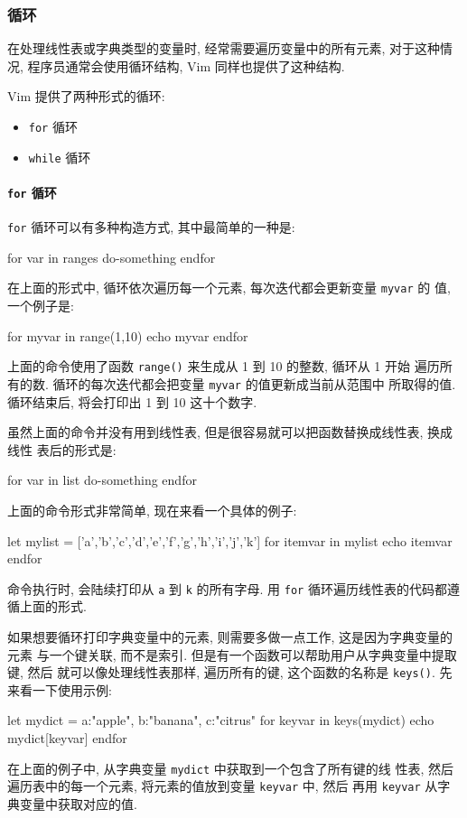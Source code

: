 \subsubsection{循环}
\label{subsubsec:loops}

在处理线性表或字典类型的变量时, 经常需要遍历变量中的所有元素, 对于这种情况,
程序员通常会使用循环结构, Vim 同样也提供了这种结构.

Vim 提供了两种形式的循环:
\begin{itemize}
	\item \texttt{for} 循环
	\item \texttt{while} 循环
\end{itemize}

\paragraph{\texttt{for} 循环}
\label{para:for_loops}

\texttt{for} 循环可以有多种构造方式, 其中最简单的一种是:
\begin{vimcode}
for var in ranges
	do-something
endfor
\end{vimcode}
在上面的形式中, 循环依次遍历每一个元素, 每次迭代都会更新变量 \texttt{myvar} 的
值, 一个例子是:
\begin{vimcode}
for myvar in range(1,10)
	echo myvar
endfor
\end{vimcode}
上面的命令使用了函数 \texttt{range()} 来生成从 1 到 10 的整数, 循环从 1 开始
遍历所有的数. 循环的每次迭代都会把变量 \texttt{myvar} 的值更新成当前从范围中
所取得的值. 循环结束后, 将会打印出 1 到 10 这十个数字.

虽然上面的命令并没有用到线性表, 但是很容易就可以把函数替换成线性表, 换成线性
表后的形式是:
\begin{vimcode}
for var in list
	do-something
endfor
\end{vimcode}
上面的命令形式非常简单, 现在来看一个具体的例子:
\begin{vimcode}
let mylist = ['a','b','c','d','e','f','g','h','i','j','k']
for itemvar in mylist
    echo itemvar
endfor
\end{vimcode}
命令执行时, 会陆续打印从 \texttt{a} 到 \texttt{k} 的所有字母. 用 \texttt{for}
循环遍历线性表的代码都遵循上面的形式.

如果想要循环打印字典变量中的元素, 则需要多做一点工作, 这是因为字典变量的元素
与一个键关联, 而不是索引. 但是有一个函数可以帮助用户从字典变量中提取键, 然后
就可以像处理线性表那样, 遍历所有的键, 这个函数的名称是 \texttt{keys()}. 先
来看一下使用示例:
\begin{vimcode}
let mydict = {a:"apple", b:"banana", c:"citrus" }
for keyvar in keys(mydict)
    echo mydict[keyvar]
endfor
\end{vimcode}
在上面的例子中, 从字典变量 \texttt{mydict} 中获取到一个包含了所有键的线
性表, 然后遍历表中的每一个元素, 将元素的值放到变量 \texttt{keyvar} 中, 然后
再用 \texttt{keyvar} 从字典变量中获取对应的值.

